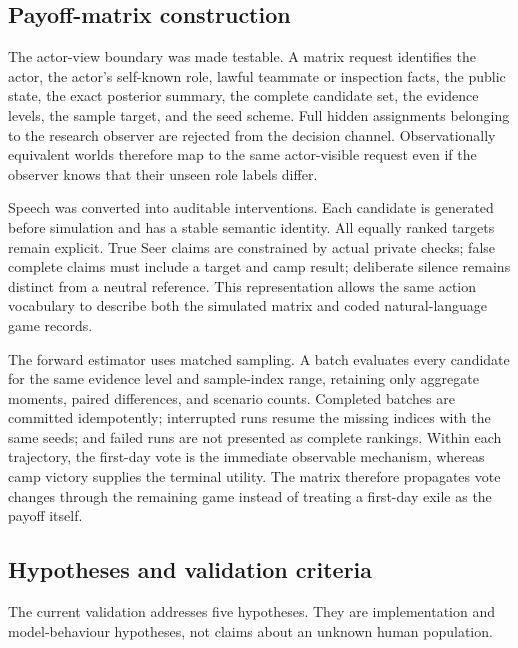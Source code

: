 \documentclass[11pt,a4paper]{article}
\begin{document}
\subsection{Payoff-matrix construction}

The actor-view boundary was made testable. A matrix request identifies the actor, the actor's self-known role, lawful teammate or inspection facts, the public state, the exact posterior summary, the complete candidate set, the evidence levels, the sample target, and the seed scheme. Full hidden assignments belonging to the research observer are rejected from the decision channel. Observationally equivalent worlds therefore map to the same actor-visible request even if the observer knows that their unseen role labels differ.

Speech was converted into auditable interventions. Each candidate is generated before simulation and has a stable semantic identity. All equally ranked targets remain explicit. True Seer claims are constrained by actual private checks; false complete claims must include a target and camp result; deliberate silence remains distinct from a neutral reference. This representation allows the same action vocabulary to describe both the simulated matrix and coded natural-language game records.

The forward estimator uses matched sampling. A batch evaluates every candidate for the same evidence level and sample-index range, retaining only aggregate moments, paired differences, and scenario counts. Completed batches are committed idempotently; interrupted runs resume the missing indices with the same seeds; and failed runs are not presented as complete rankings. Within each trajectory, the first-day vote is the immediate observable mechanism, whereas camp victory supplies the terminal utility. The matrix therefore propagates vote changes through the remaining game instead of treating a first-day exile as the payoff itself.

\subsection{Hypotheses and validation criteria}

The current validation addresses five hypotheses. They are implementation and model-behaviour hypotheses, not claims about an unknown human population.
\end{document}

